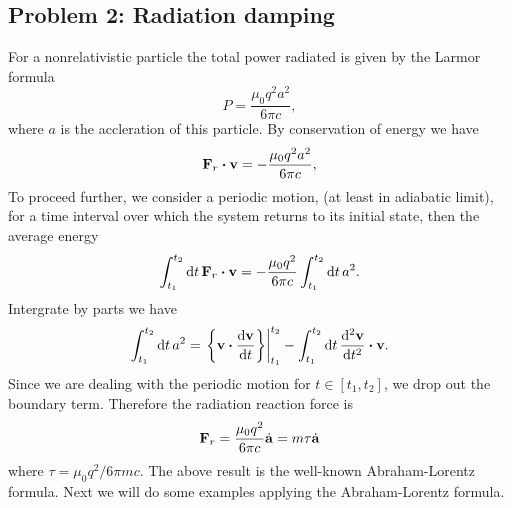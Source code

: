 \documentclass[10pt]{article}
\begin{document}
\subsection{Problem 2: Radiation damping}
For a nonrelativistic particle the total power radiated is given by the Larmor formula 
\begin{equation}
	P = \frac{\mu_0 q^2 a^2}{6\pi c},
\end{equation}
where $a$ is the accleration of this particle. By conservation of energy we have 
\begin{equation}
	\vb{F}_{r} \vdot \vb{v} = -\frac{\mu_0 q^2 a^2}{6\pi c},
\end{equation}
To proceed further, we consider a periodic motion, (at least in adiabatic limit), for a time interval over which the system returns to its initial state, then the average energy 
\begin{equation}
	\int_{t_1}^{t_2} \dd{t} \vb{F}_r \vdot \vb{v} = -\frac{\mu_0 q^2}{6\pi c} \int_{t_1}^{t_2} \dd{t} a^2.
\end{equation}
Intergrate by parts we have 
\begin{equation}
	\int_{t_1}^{t_2} \dd{t} a^2 = \eval{\qty{\vb{v} \vdot \dv{\vb{v}}{t}}}_{t_1}^{t_2} - \int_{t_1}^{t_2} \dd{t} \dv[2]{\vb{v}}{t} \vdot \vb{v}.
\end{equation}
Since we are dealing with the periodic motion for $t \in [t_1, t_2]$, we drop out the boundary term. Therefore the radiation reaction force is
\begin{equation}
	\vb{F}_r = \frac{\mu_0 q^2}{6\pi c} \dot{\vb{a}} = m \tau \dot{\vb{a}}
\end{equation}
where $\tau = \mu_0 q^2 / 6\pi m c$. The above result is the well-known Abraham-Lorentz formula. Next we will do some examples applying the Abraham-Lorentz formula. 
\end{document}

